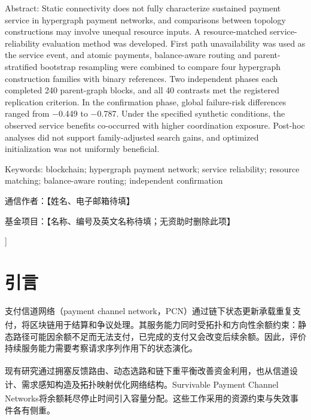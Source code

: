 \documentclass[UTF8,a4paper,twocolumn,fontset=none,zihao=5]{ctexart}
\newcommand{\upcite}[1]{\textsuperscript{\cite{#1}}}
\begin{document}
{\begin{minipage}{\textwidth}
{\small\noindent Abstract: Static connectivity does not fully characterize sustained payment service in hypergraph payment networks, and comparisons between topology constructions may involve unequal resource inputs. A resource-matched service-reliability evaluation method was developed. First path unavailability was used as the service event, and atomic payments, balance-aware routing and parent-stratified bootstrap resampling were combined to compare four hypergraph construction families with binary references. Two independent phases each completed 240 parent-graph blocks, and all 40 contrasts met the registered replication criterion. In the confirmation phase, global failure-risk differences ranged from $-$0.449 to $-$0.787. Under the specified synthetic conditions, the observed service benefits co-occurred with higher coordination exposure. Post-hoc analyses did not support family-adjusted search gains, and optimized initialization was not uniformly beneficial.\par}\vspace{3pt}

{\small\noindent Keywords: blockchain; hypergraph payment network; service reliability; resource matching; balance-aware routing; independent confirmation\par}\vspace{3pt}

{\small\noindent 通信作者：【姓名、电子邮箱待填】\par}\vspace{3pt}

{\small\noindent 基金项目：【名称、编号及英文名称待填；无资助时删除此项】\par}\vspace{3pt}

\vspace{7pt}\end{minipage}}]

\section{引言}

支付信道网络（payment channel network，PCN）通过链下状态更新承载重复支付，将区块链用于结算和争议处理\upcite{r1,r2}。其服务能力同时受拓扑和方向性余额约束：静态路径可能因余额不足而无法支付，已完成的支付又会改变后续余额。因此，评价持续服务能力需要考察请求序列作用下的状态演化。


现有研究通过拥塞反馈路由\upcite{r3}、动态选路\upcite{r4}和链下重平衡\upcite{r5}改善资金利用，也从信道设计\upcite{r6}、需求感知构造\upcite{r7}及拓扑映射\upcite{r8}优化网络结构。Survivable Payment Channel Networks将余额耗尽停止时间引入容量分配\upcite{r9}。这些工作采用的资源约束与失效事件各有侧重。
\end{document}
